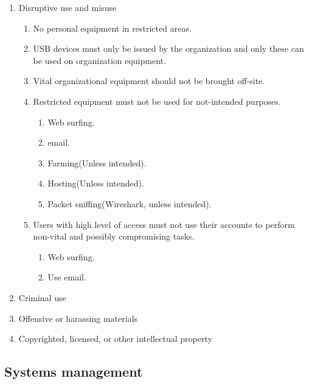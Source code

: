 \begin{enumerate}
  \item Disruptive use and misuse
  \begin{enumerate}
    \item No personal equipment in restricted areas.
    \item USB devices must only be issued by the organization and only these can be used on organization equipment.
    \item Vital organizational equipment should not be brought off-site.
    \item Restricted equipment must not be used for not-intended purposes.
    \begin{enumerate}
      \item Web surfing.
      \item email.
      \item Farming(Unless intended).
      \item Hosting(Unless intended).
      \item Packet sniffing(Wireshark, unless intended).
    \end{enumerate}
    \item Users with high level of access must not use their accounts to perform non-vital and possibly compromising tasks.
    \begin{enumerate}
        \item Web surfing.
        \item Use email.
    \end{enumerate}
  \end{enumerate}
  \item Criminal use %
  \item Offensive or harassing materials
  \item Copyrighted, licensed, or other intellectual property %
\end{enumerate}

\subsection{Systems management}

